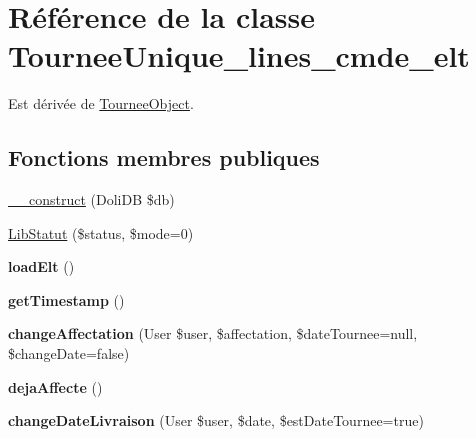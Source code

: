 \hypertarget{classTourneeUnique__lines__cmde__elt}{}\section{Référence de la classe Tournee\+Unique\+\_\+lines\+\_\+cmde\+\_\+elt}
\label{classTourneeUnique__lines__cmde__elt}


Est dérivée de \hyperlink{classTourneeObject}{Tournee\+Object}.

\subsection*{Fonctions membres publiques}
\begin{DoxyCompactItemize}
\item 
\hyperlink{classTourneeUnique__lines__cmde__elt_a8f392d1e26ead14d1f580729185505d6}{\+\_\+\+\_\+construct} (Doli\+DB \$db)
\item 
\hyperlink{classTourneeUnique__lines__cmde__elt_ae303012022e824612b569d0034574fbe}{Lib\+Statut} (\$status, \$mode=0)
\item 
\mbox{\label{classTourneeUnique__lines__cmde__elt_a0b50793f98a0ff8d5a467416ea8d8aa0}} 
{\bfseries load\+Elt} ()
\item 
\mbox{\label{classTourneeUnique__lines__cmde__elt_ac7f7df7f55b518ba18c11ab382fd6e9e}} 
{\bfseries get\+Timestamp} ()
\item 
\mbox{\label{classTourneeUnique__lines__cmde__elt_a49280aa8e5e8c85effaa94e1b5748297}} 
{\bfseries change\+Affectation} (User \$user, \$affectation, \$date\+Tournee=null, \$change\+Date=false)
\item 
\mbox{\label{classTourneeUnique__lines__cmde__elt_adbd804409ceb8514dafb407457eb2bd7}} 
{\bfseries deja\+Affecte} ()
\item 
\mbox{\label{classTourneeUnique__lines__cmde__elt_a0bece87c73c4a68b61a4d6a4a0225780}} 
{\bfseries change\+Date\+Livraison} (User \$user, \$date, \$est\+Date\+Tournee=true)
\item 
\mbox{\label{classTourneeUnique__lines__cmde__elt_aebe7b6ab8f4c527770345beebc6bc482}} 

\end{DoxyCompactItemize}
